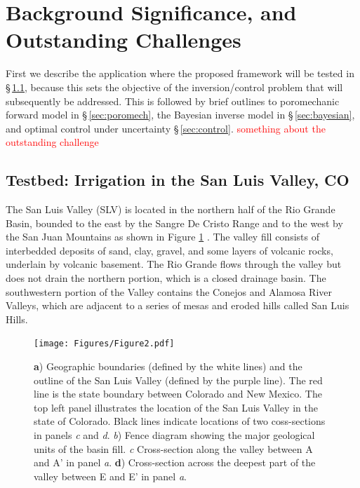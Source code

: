 \documentclass[11pt,final]{article}%
\newcommand{\note}[1]{\textcolor{red}{ #1}}
\renewcommand{\citep}{\cite}
\begin{document}
\section{Background Significance, and Outstanding Challenges}
First we describe the application where the proposed framework will be tested in \S\,\ref{sec:SLV}, because this sets the objective of the inversion/control problem that will subsequently be addressed. This is followed by brief outlines to poromechanic forward model in \S\,\ref{sec:poromech}, the Bayesian inverse model in \S\,\ref{sec:bayesian}, and optimal control under uncertainty \S\,\ref{sec:control}.
\note{something about the outstanding challenge}


\subsection{Testbed: Irrigation in the San Luis Valley, CO }\label{sec:SLV}
The San Luis Valley (SLV) is located in the northern half of the Rio Grande Basin, bounded to the east by the Sangre De Cristo Range and to the west by the San Juan Mountains as shown in Figure \ref{fig:SLV} \citep{SLV_report}. The valley fill consists of interbedded deposits of sand, clay, gravel, and some layers of volcanic rocks, underlain by volcanic basement. The Rio Grande flows through the valley but does not drain the northern portion, which is a closed drainage basin. The southwestern portion of the Valley contains the Conejos and Alamosa River Valleys, which are adjacent to a series of mesas and eroded hills called San Luis Hills.

\begin{figure}
\noindent\texttt{[image: Figures/Figure2.pdf]}
\caption{\textbf{a}) Geographic boundaries (defined by the white lines) and the outline of the San Luis Valley (defined by the purple line). The red line is the state boundary between Colorado and New Mexico. The top left panel illustrates the location of the San Luis Valley in the state of Colorado. Black lines indicate locations of two coss-sections in panels \emph{c} and \emph{d}. \emph{b}) Fence diagram showing the major geological units of the basin fill. \emph{c} Cross-section along the valley between A and A' in panel \emph{a}. \textbf{d}) Cross-section across the deepest part of the valley between E and E' in panel \emph{a}.}
\label{fig:SLV}
\end{figure}
\end{document}
